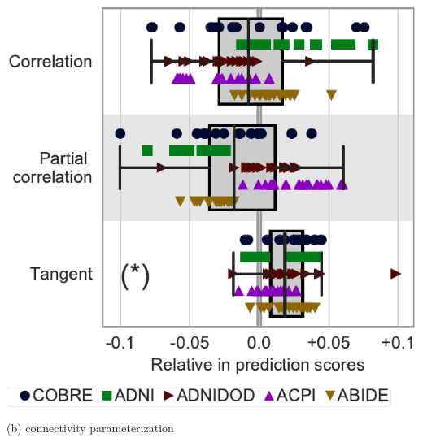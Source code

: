 \documentclass[portrait,a0,final]{a0poster} %
\begin{document}
\begin{minipage}{0.98\linewidth}
\begin{minipage}[t]{0.48\linewidth}
\begin{center}
\begin{minipage}[t]{0.48\linewidth}
\begin{center}
\includegraphics[width=0.87\linewidth]{figures/impact_plot_measure.pdf}\\\normalsize
(b) connectivity parameterization
\end{center}
\end{minipage}
\end{center}


\end{minipage}
\end{minipage}
\end{document}
